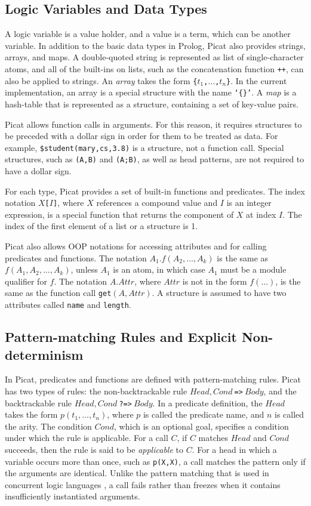 \documentclass{new_tlp}
\begin{document}
\subsection{Logic Variables and Data Types}
A logic variable is a value holder, and a value is a term, which can be another variable. In addition to the basic data types in Prolog, Picat also provides strings, arrays, and maps. A double-quoted string is represented as list of single-character atoms, and all of the built-ins on lists, such as the concatenation function \verb-++-, can also be applied to strings. An \emph{array} takes the form \texttt{\{$t_1$,$\ldots$,$t_{n}$\}}. In the current implementation, an array is a special structure with the name \texttt{`\{\}'}. A \emph{map} is a hash-table that is represented as a structure, containing a set of key-value pairs. 

Picat allows function calls in arguments. For this reason, it requires structures to be preceded with a dollar sign in order for them to be treated as data. For example, \verb+$student(mary,cs,3.8)+ is a structure, not a function call. Special structures, such as {\tt (A,B)} and {\tt (A;B)}, as well as head patterns, are not required to have a dollar sign.

For each type, Picat provides a set of built-in functions and predicates. The index notation \texttt{$X$[$I$]}, where $X$ references a compound value and $I$ is an integer expression, is a special function that returns the component of $X$ at index $I$. The index of the first element of a list or a structure is 1. 

Picat also allows OOP notations for accessing attributes and for calling predicates and functions. The notation \texttt{$A_1.f(A_2,\ldots,A_k)$} is the same as \texttt{$f(A_1,A_2,\ldots,A_k)$}, unless $A_1$ is an atom, in which case $A_1$ must be a module qualifier for $f$.  The notation $A.Attr$, where $Attr$ is not in the form $f(\ldots)$, is the same as the function call \texttt{get$(A,Attr)$}. A structure is assumed to have two attributes called \texttt{name} and \texttt{length}. 

\subsection{Pattern-matching Rules and Explicit Non-determinism}
In Picat, predicates and functions are defined with pattern-matching rules. Picat has two types of rules: the non-backtrackable rule $Head, Cond\ $\verb+=>+$\ Body$, and the backtrackable rule $Head, Cond\ $\verb+?=>+$\ Body$. In a predicate definition, the $Head$ takes the form $p(t_1,\ldots,t_n)$, where $p$ is called the predicate name, and $n$ is called the arity. The condition $Cond$, which is an optional goal, specifies a condition under which the rule is applicable. For a call $C$, if $C$ matches $Head$ and $Cond$ succeeds, then the rule is said to be \emph{applicable} to $C$. For a head in which a variable occurs more than once, such as {\tt p(X,X)}, a call matches the pattern only if the arguments are identical. Unlike the pattern matching that is used in concurrent logic languages \cite{SHA89}, a call fails rather than freezes when it contains insufficiently instantiated arguments.
\end{document}
